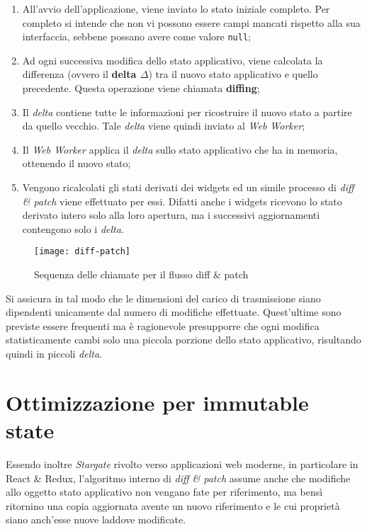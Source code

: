 \begin{enumerate}
  \item All'avvio dell'applicazione, viene inviato lo stato iniziale completo. Per completo si intende che non vi possono essere campi mancati rispetto alla sua interfaccia, sebbene possano avere come valore \texttt{null};
  \item Ad ogni successiva modifica dello stato applicativo, viene calcolata la differenza (ovvero il \textbf{delta $\Delta$}) tra il nuovo stato applicativo e quello precedente. Questa operazione viene chiamata \textbf{diffing};
  \item Il \textit{delta} contiene tutte le informazioni per ricostruire il nuovo stato a partire da quello vecchio. Tale \textit{delta} viene quindi inviato al \textit{Web Worker};
  \item Il \textit{Web Worker} applica il \textit{delta} sullo stato applicativo che ha in memoria, ottenendo il nuovo stato;
  \item Vengono ricalcolati gli stati derivati dei widgets ed un simile processo di \textit{diff \& patch} viene effettuato per essi. Difatti anche i widgets ricevono lo stato derivato intero solo alla loro apertura, ma i successivi aggiornamenti contengono solo i \textit{delta}.
\end{enumerate}

\begin{figure}[H] 
  \centering 
  \texttt{[image: diff-patch]} 
  \caption{Sequenza delle chiamate per il flusso diff \& patch}
\end{figure}

Si assicura in tal modo che le dimensioni del carico di trasmissione siano dipendenti unicamente dal numero di modifiche effettuate. Quest'ultime sono previste essere frequenti ma è ragionevole presupporre che ogni modifica statisticamente cambi solo una piccola porzione dello stato applicativo, risultando quindi in piccoli \textit{delta}. \\

\section{Ottimizzazione per immutable state}

Essendo inoltre \textit{Stargate} rivolto verso applicazioni web moderne, in particolare in React \& Redux, l'algoritmo interno di \textit{diff \& patch} assume anche che modifiche allo oggetto stato applicativo non vengano fate per riferimento, ma bensì ritornino una copia aggiornata avente un nuovo riferimento e le cui proprietà siano anch'esse nuove laddove modificate.

